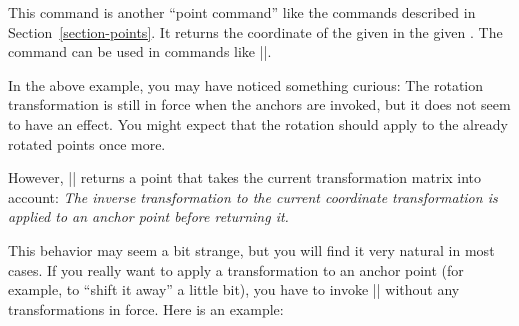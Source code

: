 \begin{command}{\pgfpointanchor{}}
    This command is another ``point command'' like the commands described in
    Section~\ref{section-points}. It returns the coordinate of the given
     in the given . The command can be used in commands
    like |\pgfpathmoveto|.
\begin{codeexample}[]
\begin{pgfpicture}

\end{pgfpicture}
\end{codeexample}

    In the above example, you may have noticed something curious: The rotation
    transformation is still in force when the anchors are invoked, but it does
    not seem to have an effect. You might expect that the rotation should apply
    to the already rotated points once more.

    However, |\pgfpointanchor| returns a point that takes the current
    transformation matrix into account: \emph{The inverse transformation to the
    current coordinate transformation is applied to an anchor point before
    returning it.}

    This behavior may seem a bit strange, but you will find it very natural in
    most cases. If you really want to apply a transformation to an anchor point
    (for example, to ``shift it away'' a little bit), you have to invoke
    |\pgfpointanchor| without any transformations in force. Here is an example:
\makeatletter
\begin{codeexample}[pre={\makeatletter}]
\begin{pgfpicture}

  {
    \pgftransformreset
    \xdef\mycoordinate{\noexpand\pgfpoint{\the\pgf@x}{\the\pgf@y}}
  }

  \pgfpathcircle{\mycoordinate}{2pt}
\end{pgfpicture}
\end{codeexample}


\end{command}

